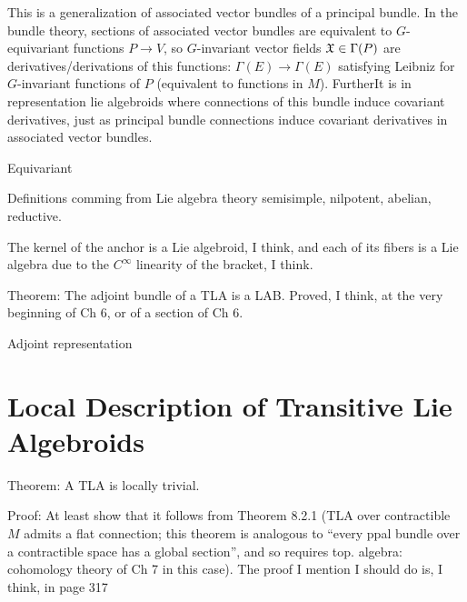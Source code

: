 \begin{definition}[Quotients]

\end{definition}


\linea

This is a generalization of associated vector bundles of a principal bundle. In the bundle theory, sections of associated vector bundles are equivalent to $G$-equivariant functions $P \to V$, so $G$-invariant vector fields $\mathfrak{X} \in \Gamma(P)$ are derivatives/derivations of this functions: $\Gamma(E) \to \Gamma(E)$ satisfying Leibniz for $G$-invariant functions of $P$ (equivalent to functions in $M$). FurtherIt is in representation lie algebroids where connections of this bundle induce covariant derivatives, just as principal bundle connections induce covariant derivatives in associated vector bundles.

\begin{definition}

\end{definition}
Equivariant

Definitions comming from Lie algebra theory semisimple, nilpotent, abelian, reductive.



The kernel of the anchor is a Lie algebroid, I think, and each of its fibers is a Lie algebra due to the $C^\infty$ linearity of the bracket, I think. 

Theorem: The adjoint bundle of a TLA is a LAB. Proved, I think, at the very beginning of Ch 6, or of a section of Ch 6.



Adjoint representation




\section{Local Description of Transitive Lie Algebroids}

Theorem: A TLA is locally trivial.

Proof: At least show that it follows from Theorem 8.2.1 (TLA over contractible $M$ admits a flat connection; this theorem is analogous to ``every ppal bundle over a contractible space has a global section'', and so requires top. algebra: cohomology theory of Ch 7 in this case). The proof I mention I should do is, I think, in page 317


